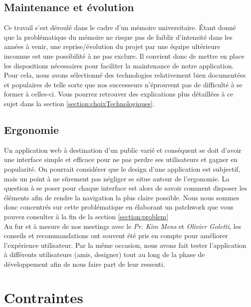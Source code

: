 
\subsection*{Maintenance et évolution}

Ce travail s'est déroulé dans le cadre d'un mémoire universitaire. Étant donné que la problématique du mémoire ne risque pas de faiblir d'intensité dans les années à venir, une reprise/évolution du projet par une équipe ultérieure inconnue est une possibilité à ne pas exclure. Il convient donc de mettre en place les dispositions nécessaires pour faciliter la maintenance de notre application. \\

Pour cela, nous avons sélectionné des technologies relativement bien documentées et populaires de telle sorte que nos successeurs n'éprouvent pas de difficulté à se former à celles-ci. Vous pourrez retrouver des explications plus détaillées à ce sujet dans la section \ref{section:choixTechnologiques}.

\subsection*{Ergonomie}

Un application web à destination d'un public varié et conséquent se doit d'avoir une interface simple et efficace pour ne pas perdre ses utilisateurs et gagner en popularité. On pourrait considérer que le design d'une application est subjectif, mais un point à ne sûrement pas négliger se situe autour de l'ergonomie. La question à se poser pour chaque interface est alors de savoir comment disposer les éléments afin de rendre la navigation la plus claire possible. Nous nous sommes donc concentrés sur cette problématique en élaborant un patchwork que vous pouvez consulter à la fin de la section \ref{section:problem}\\

Au fur et à mesure de nos meetings avec le \textit{Pr. Kim Mens} et \textit{Olivier Goletti}, les conseils et recommandations ont souvent été pris en compte pour améliorer l'expérience utilisateur. Par la même occasion, nous avons fait tester l'application à différents utilisateurs (amis, designer) tout au long de la phase de développement afin de nous faire part de leur ressenti.

\pagebreak
\section {Contraintes}

